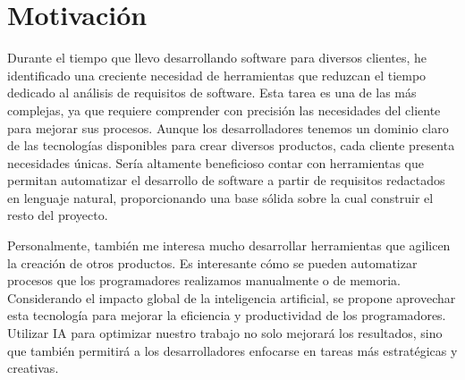 \section{Motivación}\label{section:motivacion}

Durante el tiempo que llevo desarrollando software para diversos clientes, he identificado una creciente necesidad de herramientas que reduzcan el tiempo dedicado al análisis de requisitos de software. Esta tarea es una de las más complejas, ya que requiere comprender con precisión las necesidades del cliente para mejorar sus procesos. Aunque los desarrolladores tenemos un dominio claro de las tecnologías disponibles para crear diversos productos, cada cliente presenta necesidades únicas. Sería altamente beneficioso contar con herramientas que permitan automatizar el desarrollo de software a partir de requisitos redactados en lenguaje natural, proporcionando una base sólida sobre la cual construir el resto del proyecto.

Personalmente, también me interesa mucho desarrollar herramientas que agilicen la creación de otros productos. Es interesante cómo se pueden automatizar procesos que los programadores realizamos manualmente o de memoria. Considerando el impacto global de la inteligencia artificial, se propone aprovechar esta tecnología para mejorar la eficiencia y productividad de los programadores. Utilizar IA para optimizar nuestro trabajo no solo mejorará los resultados, sino que también permitirá a los desarrolladores enfocarse en tareas más estratégicas y creativas.
